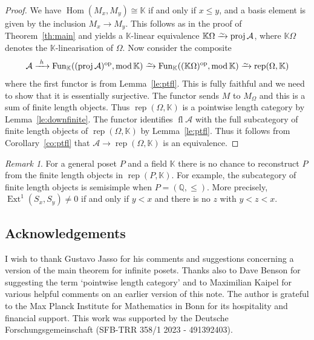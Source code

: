 \documentclass[a4paper]{amsart}
\theoremstyle{plain}
\theoremstyle{definition}
\theoremstyle{remark}
\newtheorem{rem}[thm]{Remark}
\numberwithin{equation}{section}
\newcommand{\Ext}{\operatorname{Ext}}
\newcommand{\fl}{\operatorname{fl}}
\newcommand{\Fun}{\operatorname{Fun}}
\newcommand{\Hom}{\operatorname{Hom}}
\renewcommand{\mod}{\operatorname{mod}}
\newcommand{\proj}{\operatorname{proj}}
\newcommand{\rep}{\operatorname{rep}}
\newcommand{\op}{\mathrm{op}}
\newcommand{\iso}{\xrightarrow{\raisebox{-.4ex}[0ex][0ex]{$\scriptstyle{\sim}$}}}
\newcommand{\xto}{\xrightarrow}
\def\A{\mathcal A}
\def\bbK{\mathbb K}
\def\bbQ{\mathbb Q}
\def\Om{\Omega}
\begin{document}
\begin{proof}
  We have $\Hom(M_x,M_y)\cong\bbK$ if and only if $x\le y$, and a
  basis element is given by the inclusion $M_x\to M_y$. This follows
  as in the proof of Theorem~\ref{th:main} and yields a $\bbK$-linear
  equivalence $\bbK \Om\iso\proj\A$, where $\bbK \Om$ denotes the
  $\bbK$-linearisation of $\Om$.  Now consider the composite
\[\A\xto{\ h\ }\Fun_\bbK((\proj\A)^\op,\mod\bbK)\iso\Fun_\bbK((\bbK
  \Om)^\op,\mod\bbK) \iso\rep(\Om,\bbK)\]
where the first  functor is
from Lemma~\ref{le:ptfl}. This is fully faithful and we need to
show that it is essentially surjective. The functor sends $M$ to $M_\Om$
and this is a sum of finite length objects. Thus $\rep(\Om,\bbK)$ is a
pointwise length category by Lemma~\ref{le:downfinite}. The functor
identifies $\fl\A$ with the full subcategory of finite length objects
of $\rep(\Om,\bbK)$ by Lemma~\ref{le:ptfl}. Thus it follows from
Corollary~\ref{co:ptfl} that $\A\to \rep(\Om,\bbK)$ is an equivalence.
\end{proof}

\begin{rem}
  For a general poset $P$ and a field $\bbK$ there is no chance to
  reconstruct $P$ from the finite length objects in $\rep(P,\bbK)$.
  For example, the subcategory of finite length objects is semisimple
  when $P=(\bbQ,\le)$. More precisely, $\Ext^1(S_x,S_y)\neq 0$ if and
  only if $y<x$ and there is no $z$ with $y<z<x$.
\end{rem}



\subsection*{Acknowledgements}

I wish to thank Gustavo Jasso for his comments and suggestions
concerning a version of the main theorem for infinite posets. Thanks
also to Dave Benson for suggesting the term `pointwise length
category' and to Maximilian Kaipel for various helpful comments on an
earlier version of this note. The author is grateful to the Max Planck
Institute for Mathematics in Bonn for its hospitality and financial
support. This work was supported by the Deutsche
Forschungsgemeinschaft (SFB-TRR 358/1 2023 - 491392403).
\end{document}
